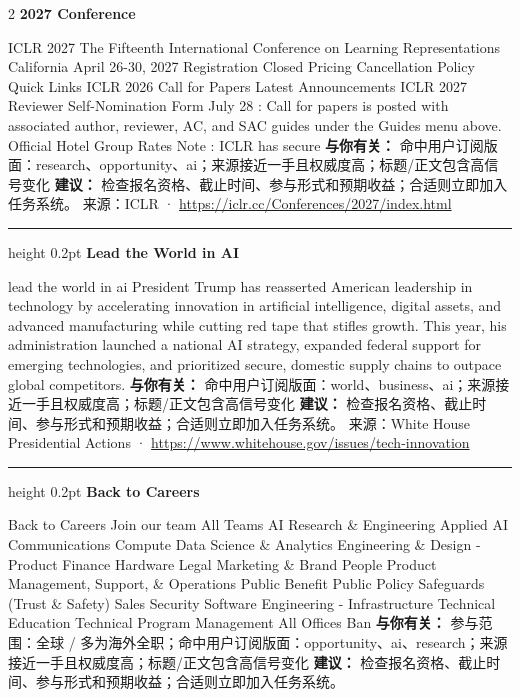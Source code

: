 \documentclass[10.5pt]{ctexart}
\begin{document}
\begin{multicols}{2}
{\large\bfseries 2027 Conference}\par
ICLR 2027 The Fifteenth International Conference on Learning Representations California April 26-30, 2027 Registration Closed Pricing Cancellation Policy Quick Links ICLR 2026 Call for Papers Latest Announcements ICLR 2027 Reviewer Self-Nomination Form July 28 : Call for papers is posted with associated author, reviewer, AC, and SAC guides under the Guides menu above. Official Hotel Group Rates Note : ICLR has secure
\textbf{与你有关：} 命中用户订阅版面：research、opportunity、ai；来源接近一手且权威度高；标题/正文包含高信号变化
\textbf{建议：} 检查报名资格、截止时间、参与形式和预期收益；合适则立即加入任务系统。
{\footnotesize\color{ormuted} 来源：ICLR · \url{https://iclr.cc/Conferences/2027/index.html}}
\vspace{2mm}
\hrule height 0.2pt
\vspace{2mm}
{\large\bfseries Lead the World in AI}\par
lead the world in ai President Trump has reasserted American leadership in technology by accelerating innovation in artificial intelligence, digital assets, and advanced manufacturing while cutting red tape that stifles growth. This year, his administration launched a national AI strategy, expanded federal support for emerging technologies, and prioritized secure, domestic supply chains to outpace global competitors.
\textbf{与你有关：} 命中用户订阅版面：world、business、ai；来源接近一手且权威度高；标题/正文包含高信号变化
\textbf{建议：} 检查报名资格、截止时间、参与形式和预期收益；合适则立即加入任务系统。
{\footnotesize\color{ormuted} 来源：White House Presidential Actions · \url{https://www.whitehouse.gov/issues/tech-innovation}}
\vspace{2mm}
\hrule height 0.2pt
\vspace{2mm}
{\large\bfseries Back to Careers}\par
Back to Careers Join our team All Teams AI Research \& Engineering Applied AI Communications Compute Data Science \& Analytics Engineering \& Design - Product Finance Hardware Legal Marketing \& Brand People Product Management, Support, \& Operations Public Benefit Public Policy Safeguards (Trust \& Safety) Sales Security Software Engineering - Infrastructure Technical Education Technical Program Management All Offices Ban
\textbf{与你有关：} 参与范围：全球 / 多为海外全职；命中用户订阅版面：opportunity、ai、research；来源接近一手且权威度高；标题/正文包含高信号变化
\textbf{建议：} 检查报名资格、截止时间、参与形式和预期收益；合适则立即加入任务系统。

\end{multicols}
\end{document}

